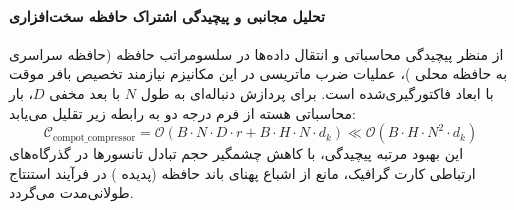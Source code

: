 \paragraph{تحلیل مجانبی و پیچیدگی اشتراک حافظه سخت‌افزاری}
از منظر پیچیدگی محاسباتی و انتقال داده‌ها در سلسومراتب حافظه (حافظه سراسری  به حافظه محلی )، عملیات ضرب ماتریسی در این مکانیزم نیازمند تخصیص بافر موقت با ابعاد فاکتورگیری‌شده است. برای پردازش دنباله‌ای به طول $N$ با بعد مخفی $D$، بار محاسباتی هسته از فرم درجه دو به رابطه زیر تقلیل می‌یابد:
\begin{equation}
\label{eq:complexity_compot_compressor}
\mathcal{C}_{\text{compot\_compressor}} = \mathcal{O}\left( B \cdot N \cdot D \cdot r + B \cdot H \cdot N \cdot d_k \right) \ll \mathcal{O}\left( B \cdot H \cdot N^2 \cdot d_k \right)
\end{equation}
این بهبود مرتبه پیچیدگی، با کاهش چشمگیر حجم تبادل تانسورها در گذرگاه‌های ارتباطی کارت گرافیک، مانع از اشباع پهنای باند حافظه (پدیده ) در فرآیند استنتاج طولانی‌مدت می‌گردد.
